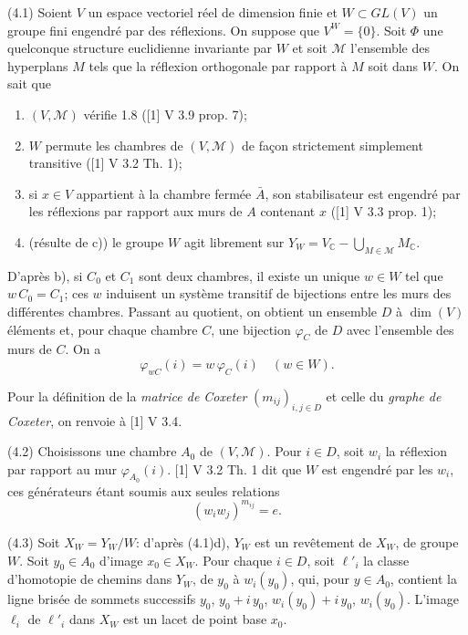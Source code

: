 \documentclass[12pt]{article}
\theoremstyle{remark}
\newcommand{\CC}{\mathbb{C}}
\begin{document}
(4.1) Soient $V$ un espace vectoriel réel de dimension finie et $W \subset GL(V)$ un groupe fini engendré par des réflexions. On suppose que $V^W = \{0\}$. Soit $\Phi$ une quelconque structure euclidienne invariante par $W$ et soit $\mathcal{M}$ l'ensemble des hyperplans $M$ tels que la réflexion orthogonale par rapport à $M$ soit dans $W$. On sait que
\begin{enumerate}
\item[a)] $(V, \mathcal{M})$ vérifie 1.8 ([1] V 3.9 prop. 7);
\item[b)] $W$ permute les chambres de $(V, \mathcal{M})$ de façon strictement simplement transitive ([1] V 3.2 Th. 1);
\item[c)] si $x \in V$ appartient à la chambre fermée $\bar{A}$, son stabilisateur est engendré par les réflexions par rapport aux murs de $A$ contenant $x$ ([1] V 3.3 prop. 1);
\item[d)] (résulte de c)) le groupe $W$ agit librement sur $Y_W = V_\CC - \bigcup_{M \in \mathcal{M}} M_\CC$.
\end{enumerate}

D'après b), si $C_0$ et $C_1$ sont deux chambres, il existe un unique $w \in W$ tel que $w \, C_0 = C_1$; ces $w$ induisent un système transitif de bijections entre les murs des différentes chambres. Passant au quotient, on obtient un ensemble $D$ à $\dim(V)$ éléments et, pour chaque chambre $C$, une bijection $\varphi_C$ de $D$ avec l'ensemble des murs de $C$. On a
\begin{equation}
\varphi_{wC}(i) = w \, \varphi_C(i) \quad (w \in W).\tag{4.1.1}
\end{equation}

Pour la définition de la \emph{matrice de Coxeter} $(m_{ij})_{i, j \in D}$ et celle du \emph{graphe de Coxeter}, on renvoie à [1] V 3.4.

(4.2) Choisissons une chambre $A_0$ de $(V, \mathcal{M})$. Pour $i \in D$, soit $w_i$ la réflexion par rapport au mur $\varphi_{A_0}(i)$. [1] V 3.2 Th. 1 dit que $W$ est engendré par les $w_i$, ces générateurs étant soumis aux seules relations
\[(w_i w_j)^{m_{ij}} = e.\]

(4.3) Soit $X_W = Y_W/W$: d'après (4.1)d), $Y_W$ est un revêtement de $X_W$, de groupe $W$. Soit $y_0 \in A_0$ d'image $x_0 \in X_W$. Pour chaque $i \in D$, soit $\ell'_i$ la classe d'homotopie de chemins dans $Y_W$, de $y_0$ à $w_i(y_0)$, qui, pour $y \in A_0$, contient la ligne brisée de sommets successifs $y_0$, $y_0 + i \, y_0$, $w_i(y_0) + i \, y_0$, $w_i(y_0)$. L'image $\ell_i$ de $\ell'_i$ dans $X_W$ est un lacet de point base $x_0$.
\end{document}
